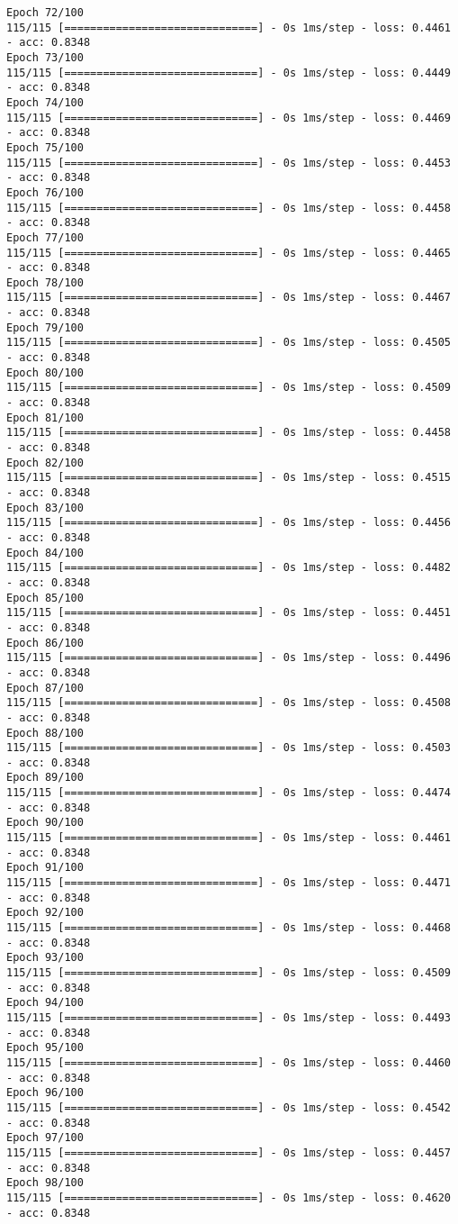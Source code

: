 \documentclass[11pt]{article}
\begin{document}
\begin{Verbatim}[commandchars=\\\{\}]
Epoch 72/100
115/115 [==============================] - 0s 1ms/step - loss: 0.4461 - acc: 0.8348
Epoch 73/100
115/115 [==============================] - 0s 1ms/step - loss: 0.4449 - acc: 0.8348
Epoch 74/100
115/115 [==============================] - 0s 1ms/step - loss: 0.4469 - acc: 0.8348
Epoch 75/100
115/115 [==============================] - 0s 1ms/step - loss: 0.4453 - acc: 0.8348
Epoch 76/100
115/115 [==============================] - 0s 1ms/step - loss: 0.4458 - acc: 0.8348
Epoch 77/100
115/115 [==============================] - 0s 1ms/step - loss: 0.4465 - acc: 0.8348
Epoch 78/100
115/115 [==============================] - 0s 1ms/step - loss: 0.4467 - acc: 0.8348
Epoch 79/100
115/115 [==============================] - 0s 1ms/step - loss: 0.4505 - acc: 0.8348
Epoch 80/100
115/115 [==============================] - 0s 1ms/step - loss: 0.4509 - acc: 0.8348
Epoch 81/100
115/115 [==============================] - 0s 1ms/step - loss: 0.4458 - acc: 0.8348
Epoch 82/100
115/115 [==============================] - 0s 1ms/step - loss: 0.4515 - acc: 0.8348
Epoch 83/100
115/115 [==============================] - 0s 1ms/step - loss: 0.4456 - acc: 0.8348
Epoch 84/100
115/115 [==============================] - 0s 1ms/step - loss: 0.4482 - acc: 0.8348
Epoch 85/100
115/115 [==============================] - 0s 1ms/step - loss: 0.4451 - acc: 0.8348
Epoch 86/100
115/115 [==============================] - 0s 1ms/step - loss: 0.4496 - acc: 0.8348
Epoch 87/100
115/115 [==============================] - 0s 1ms/step - loss: 0.4508 - acc: 0.8348
Epoch 88/100
115/115 [==============================] - 0s 1ms/step - loss: 0.4503 - acc: 0.8348
Epoch 89/100
115/115 [==============================] - 0s 1ms/step - loss: 0.4474 - acc: 0.8348
Epoch 90/100
115/115 [==============================] - 0s 1ms/step - loss: 0.4461 - acc: 0.8348
Epoch 91/100
115/115 [==============================] - 0s 1ms/step - loss: 0.4471 - acc: 0.8348
Epoch 92/100
115/115 [==============================] - 0s 1ms/step - loss: 0.4468 - acc: 0.8348
Epoch 93/100
115/115 [==============================] - 0s 1ms/step - loss: 0.4509 - acc: 0.8348
Epoch 94/100
115/115 [==============================] - 0s 1ms/step - loss: 0.4493 - acc: 0.8348
Epoch 95/100
115/115 [==============================] - 0s 1ms/step - loss: 0.4460 - acc: 0.8348
Epoch 96/100
115/115 [==============================] - 0s 1ms/step - loss: 0.4542 - acc: 0.8348
Epoch 97/100
115/115 [==============================] - 0s 1ms/step - loss: 0.4457 - acc: 0.8348
Epoch 98/100
115/115 [==============================] - 0s 1ms/step - loss: 0.4620 - acc: 0.8348

\end{Verbatim}
\end{document}
